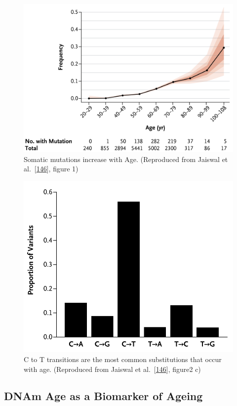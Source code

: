 \documentclass[
]{book}
\begin{document}
\begin{figure}

{\centering \includegraphics[width=0.6\linewidth]{figs/Jaiswal2014fig1_somaticMutationAge} 

}

\caption{Somatic mutations increase with Age. (Reproduced from Jaiswal et al.~{[}\protect\hyperlink{ref-Jaiswal2014c}{146}{]}, figure 1)}\label{fig:Jaiswal2014fig1}
\end{figure}



\begin{figure}

{\centering \includegraphics[width=0.6\linewidth]{figs/Jaiswal2014fig2c} 

}

\caption{C to T transitions are the most common substitutions that occur with age. (Reproduced from Jaiswal et al.~{[}\protect\hyperlink{ref-Jaiswal2014c}{146}{]}, figure2 c)}\label{fig:Jaiswal2014fig2c}
\end{figure}



\hypertarget{dnam-age-as-a-biomarker-of-ageing}{%
\subsection{DNAm Age as a Biomarker of Ageing}\label{dnam-age-as-a-biomarker-of-ageing}}
\end{document}
